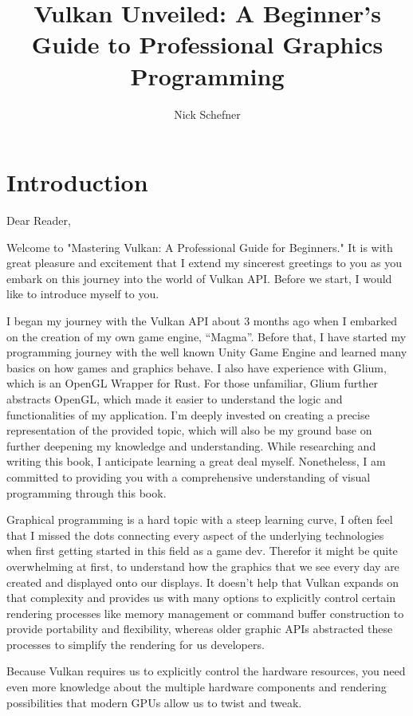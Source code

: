 \documentclass[12pt]{report} \usepackage{preamble}
\title{\textbf{\huge Vulkan Unveiled: A Beginner's Guide to Professional
  Graphics Programming}} \author {Nick Schefner}
\begin{document}
 \maketitle

\tableofcontents

\chapter{Introduction}

Dear Reader,

Welcome to "Mastering Vulkan: A Professional Guide for Beginners."  It is
with great pleasure and excitement that I extend my sincerest greetings
to you as you embark on this journey into the world of Vulkan API.
Before we start, I would like to introduce myself to you.

I began my journey with the Vulkan API about 3 months ago when I embarked
on the creation of my own game engine, “Magma”.  Before that, I have
started my programming journey with the well known Unity Game Engine
and learned many basics on how games and graphics behave. I also have
experience with Glium, which is an OpenGL Wrapper for Rust. For those
unfamiliar, Glium further abstracts OpenGL, which made it easier to
understand the logic and functionalities of my application.  I’m deeply
invested on creating a precise representation of the provided topic,
which will also be my ground base on further deepening my knowledge and
understanding.	While researching and writing this book, I anticipate
learning a great deal myself.  Nonetheless, I am committed to providing
you with a comprehensive understanding of visual programming through
this book.

Graphical programming is a hard topic with a steep learning curve,
I often feel that I missed the dots connecting every aspect of the
underlying technologies when first getting started in this field as a
game dev. Therefor it might be quite overwhelming at first, to understand
how the graphics that we see every day are created and displayed onto
our displays. It doesn’t help that Vulkan expands on that complexity
and provides us with many options to explicitly control certain rendering
processes like memory management or command buffer construction to provide
portability and flexibility, whereas older graphic APIs abstracted these
processes to simplify the rendering for us developers.

Because Vulkan requires us to explicitly control the hardware resources,
you need even more knowledge about the multiple hardware components and
rendering possibilities that modern GPUs allow us to twist and tweak.
\end{document}
